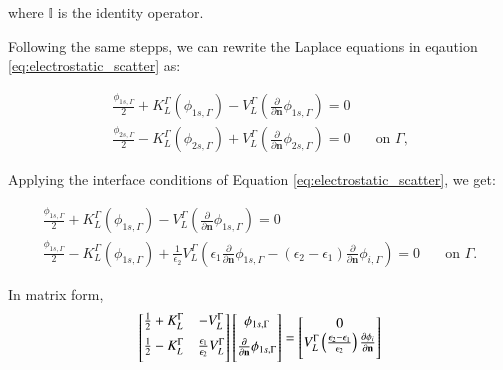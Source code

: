 \noindent where $\mathbb{I}$ is the identity operator.

Following the same stepps, we can rewrite the Laplace equations in eqaution
\eqref{eq:electrostatic_scatter} as:

%
\begin{align} \label{eq:integral_eq_lspr_nobc}
\frac{\phi_{1s,\Gamma}}{2}+ K_{L}^{\Gamma}(\phi_{1s,\Gamma}) - V_{L}^{\Gamma} \left(\frac{\partial}{\partial \mathbf{n}}\phi_{1s,\Gamma} \right) = 0&  \nonumber \\
\frac{\phi_{2s,\Gamma}}{2} - K_{L}^{\Gamma}(\phi_{2s,\Gamma}) + V_{L}^{\Gamma} \left( \frac{\partial}{\partial \mathbf{n}} \phi_{2s,\Gamma} \right) = 0& \quad \text{on $\Gamma$,}
\end{align}

Applying the interface conditions of Equation \eqref{eq:electrostatic_scatter},
we get:

\begin{align} \label{eq:integral_eq_lspr}
\frac{\phi_{1s,\Gamma}}{2}+ K_{L}^{\Gamma}(\phi_{1s,\Gamma}) - V_{L}^{\Gamma} \left(\frac{\partial}{\partial \mathbf{n}}\phi_{1s,\Gamma} \right) = 0&  \nonumber \\
\frac{\phi_{1s,\Gamma}}{2} - K_{L}^{\Gamma}(\phi_{1s,\Gamma}) + \frac{1}{\epsilon_2}V_{L}^{\Gamma} \left( \epsilon_1 \frac{\partial}{\partial \mathbf{n}} \phi_{1s,\Gamma} - (\epsilon_2-\epsilon_1) \frac{\partial}{\partial \mathbf{n}} \phi_{i,\Gamma} \right) = 0& \quad \text{on $\Gamma$.}
\end{align}

In matrix form,
%
 \begin{equation} \label{eq:matrix_lspr}
 \left[
    \begin{matrix} 
       \frac{1}{2} + K_{L}^{\Gamma} & -V_{L}^{\Gamma}  \vspace{0.2cm} \\
       \frac{1}{2} - K_{L}^{\Gamma} &  \frac{\epsilon_1}{\epsilon_2} V_{L}^{\Gamma}  \vspace{0.2cm} 
    \end{matrix}
    \right] \left[ 
    \begin{matrix} 
       \phi_{1s,\Gamma} \vspace{0.2cm} \\
       \frac{\partial}{\partial \mathbf{n}} \phi_{1s,\Gamma} \vspace{0.2cm}
    \end{matrix} 
     \right] =   
    \left[
    \begin{matrix} 
       0 \\
       V_{L}^{\Gamma} \left(\frac{\epsilon_2-\epsilon_1}{\epsilon_2}\right) \frac{\partial\phi_i}{\partial\mathbf{n}} \vspace{0.2cm} 
    \end{matrix}
    \right]
 \end{equation}






